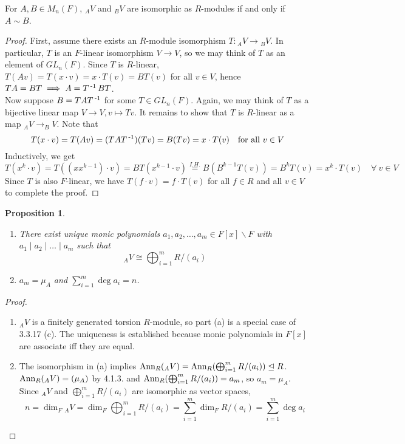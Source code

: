 \documentclass[11pt]{book}
\newcounter{counter}
\newtheorem{proposition}[counter]{Proposition}   \newtheorem{problem}[counter]{Problem}   \newtheorem*{proposition*}{Proposition}   \newtheorem*{lemma*}{Lemma}
\theoremstyle{definition}   \newtheorem{defn}[counter]{Definition} %
\newcommand{\bs}{\backslash}   \newcommand{\A}{\mathcal{A}}   \newcommand{\sy}{\textnormal{Syl}}   \newcommand{\size}[1]{\left| #1 \right|}
\newcommand{\nsg}{\mathrel{\unlhd}}   \newcommand{\ind}{\parindent24pt}   \newcommand{\vn}{\varnothing}
\newcommand{\ann}[2]{\textnormal{Ann}_{#1}(#2)}   \newcommand{\rk}{\textnormal{rk}}
\DeclareMathOperator{\ra}{\rightarrow}   \DeclareMathOperator{\Poly}{\mathbf{P}}   \DeclareMathOperator{\spn}{\textnormal{span}}   \DeclareMathOperator{\aut}{\textnormal{Aut}}
\newcommand{\vs}{\vspace{8pt}}
\numberwithin{counter}{chapter}
\begin{document}
\vs

\begin{lemma}
For $A,B \in M_n(F)$, $_AV$ and $_BV$ are isomorphic as $R$-modules if and only if $A \sim B$.
\end{lemma}

\begin{proof}
First, assume there exists an $R$-module isomorphism $T : {_AV} \ra {_BV}$. In particular, $T$ is an $F$-linear isomorphism $V \ra V$, so we may think of $T$ as an element of $GL_n(F)$. Since $T$ is $R$-linear, \\ $T(Av) = T(x \cdot v) = x \cdot T(v) = B T(v)$ for all $v \in V$, hence $TA = BT \implies A = T\operatorname{^{-1}} BT$. \\

Now suppose $B = TAT\operatorname{^{-1}}$ for some $T \in GL_n(F)$. Again, we may think of $T$ as a bijective linear map $V \ra V, v \mapsto Tv$. It remains to show that $T$ is $R$-linear as a map $_AV \ra _BV$. Note that
	\[T(x \cdot v) = T(Av) = (TAT\operatorname{^{-1}})(Tv) = B(Tv) = x \cdot T(v) \quad \textnormal{for all } v \in V \]
Inductively, we get
	\[T(x^k \cdot v) = T((x x^{k-1}) \cdot v) = B T(x^{k-1} \cdot v) \overset{I. H.}{=} B(B^{k-1} T(v)) = B^k T(v) = x^{k} \cdot T(v) \quad \forall \ v \in V \]
Since $T$ is also $F$-linear, we have $T(f \cdot v) = f \cdot T(v)$ for all $f \in R$ and all $v \in V$ to complete the proof.
\end{proof}

\newpage

\begin{proposition}\
\begin{enumerate}
\item[(a)] There exist unique monic polynomials $a_1,a_2,\dots,a_m \in F[x]\bs F$ with $a_1 \mid a_2 \mid \dots \mid a_m$ such that
	\[_AV \cong \bigoplus_{i=1}^m R/(a_i) \]
\item[(b)] $a_m = \mu_A$ and $\sum_{i=1}^m \deg a_i = n$.
\end{enumerate}
\end{proposition}

\begin{proof}\
\begin{enumerate}
\item[(a)] $_AV$ is a finitely generated torsion $R$-module, so part (a) is a special case of 3.3.17 (c). The uniqueness is established because monic polynomials in $F[x]$ are associate iff they are equal.
\item[(b)] The isomorphism in (a) implies $\ann{R}{_AV} = \ann{R}{\bigoplus_{i=1}^m R/(a_i)} \nsg R$. $\ann{R}{_AV} = (\mu_A)$ by 4.1.3. and $\ann{R}{\bigoplus_{i=1}^m R/(a_i)} = a_m$, so $a_m = \mu_A$. Since $_AV$ and $\bigoplus_{i=1}^m R/(a_i)$ are isomorphic as vector spaces,
	\[n = \dim_F {_AV} = \dim_F \bigoplus_{i=1}^m R/(a_i) = \sum_{i=1}^m \dim_F R/(a_i) = \sum_{i=1}^m \deg a_i \]
\end{enumerate}
\end{proof}
\end{document}
